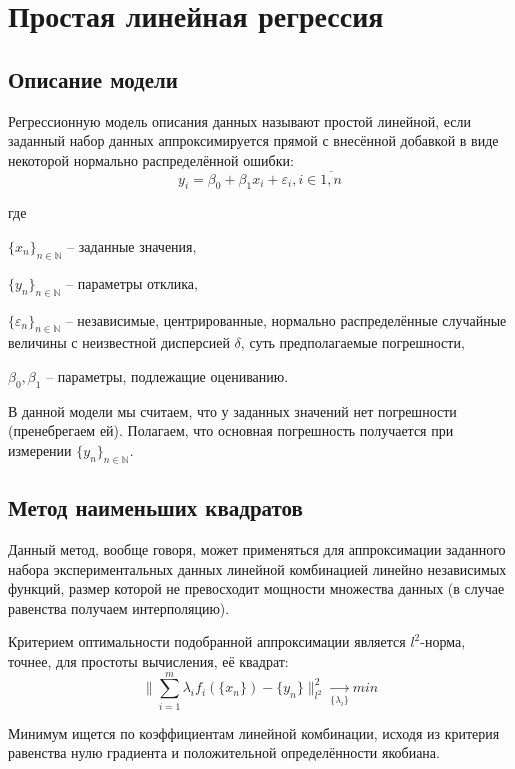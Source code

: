 \section{Простая линейная регрессия}
\subsection{Описание модели}

Регрессионную модель описания данных называют простой линейной, если заданный набор данных аппроксимируется прямой с внесённой добавкой в виде некоторой нормально распределённой ошибки:
\begin{equation}
y_i = \beta_0 + \beta_1 x_i + \varepsilon_i, i \in \overline{1,n}
\end{equation}

где 

$\{x_n\}_{n \in \mathbb{N}}$ -- заданные значения,

$\{y_n\}_{n \in \mathbb{N}}$ -- параметры отклика,

$\{\varepsilon_n\}_{n \in \mathbb{N}}$ -- независимые, центрированные, нормально распределённые случайные величины с неизвестной дисперсией $\delta$, суть предполагаемые погрешности,

$\beta_0, \beta_1$ -- параметры, подлежащие оцениванию.

В данной модели мы считаем, что у заданных значений нет погрешности (пренебрегаем ей). Полагаем, что основная погрешность получается при измерении $\{y_n\}_{n \in \mathbb{N}}$.

\subsection{Метод наименьших квадратов}

Данный метод, вообще говоря, может применяться для аппроксимации заданного набора экспериментальных данных линейной комбинацией линейно независимых функций, размер которой не превосходит мощности множества данных (в случае равенства получаем интерполяцию).

Критерием оптимальности подобранной аппроксимации является $l^2$-норма, точнее, для простоты вычисления, её квадрат:
\begin{equation}\label{eq:lsm}
\|\displaystyle \sum_{i=1}^{m} \lambda_i f_i(\{x_n\}) - \{y_n\} \|_{l^2}^{2} \underset{\{\lambda_i\}}{\longrightarrow} min
\end{equation}

Минимум ищется по коэффициентам линейной комбинации, исходя из критерия равенства нулю градиента и положительной определённости якобиана.

